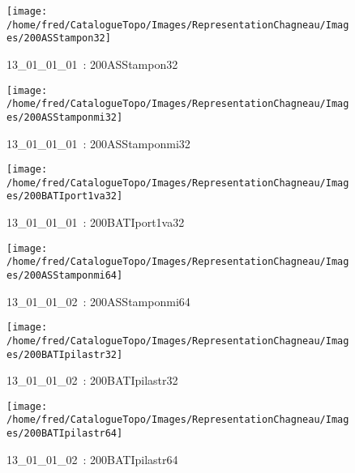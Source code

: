 \documentclass[12pt,titlepage,oneside]{book}
\begin{document}
\begin{figure}[h!]
  \hfill         %
  \begin{minipage}[t]{3cm}
    \begin{center}
      \texttt{[image: /home/fred/CatalogueTopo/Images/RepresentationChagneau/Images/200ASStampon32]}
      \caption[~13\_01\_01\_01]{\small{13\_01\_01\_01~:} \tiny{200ASStampon32}}\label{200ASStampon32}
    \end{center}
  \end{minipage}
  \begin{minipage}[t]{3cm}
    \begin{center}
      \texttt{[image: /home/fred/CatalogueTopo/Images/RepresentationChagneau/Images/200ASStamponmi32]}
      \caption[~13\_01\_01\_01]{\small{13\_01\_01\_01~:} \tiny{200ASStamponmi32}}\label{200ASStamponmi32}
    \end{center}
  \end{minipage}
  \begin{minipage}[t]{3cm}
    \begin{center}
      \texttt{[image: /home/fred/CatalogueTopo/Images/RepresentationChagneau/Images/200BATIport1va32]}
      \caption[~13\_01\_01\_01]{\small{13\_01\_01\_01~:} \tiny{200BATIport1va32}}\label{200BATIport1va32}
    \end{center}
  \end{minipage}
  \begin{minipage}[t]{3cm}
    \begin{center}
      \texttt{[image: /home/fred/CatalogueTopo/Images/RepresentationChagneau/Images/200ASStamponmi64]}
      \caption[~13\_01\_01\_02]{\small{13\_01\_01\_02~:} \tiny{200ASStamponmi64}}\label{200ASStamponmi64}
    \end{center}
  \end{minipage}
  \begin{minipage}[t]{3cm}
    \begin{center}
      \texttt{[image: /home/fred/CatalogueTopo/Images/RepresentationChagneau/Images/200BATIpilastr32]}
      \caption[~13\_01\_01\_02]{\small{13\_01\_01\_02~:} \tiny{200BATIpilastr32}}\label{200BATIpilastr32}
    \end{center}
  \end{minipage}
  \begin{minipage}[t]{3cm}
    \begin{center}
      \texttt{[image: /home/fred/CatalogueTopo/Images/RepresentationChagneau/Images/200BATIpilastr64]}
      \caption[~13\_01\_01\_02]{\small{13\_01\_01\_02~:} \tiny{200BATIpilastr64}}\label{200BATIpilastr64}
    \end{center}
  \end{minipage}
\end{figure}
\end{document}
